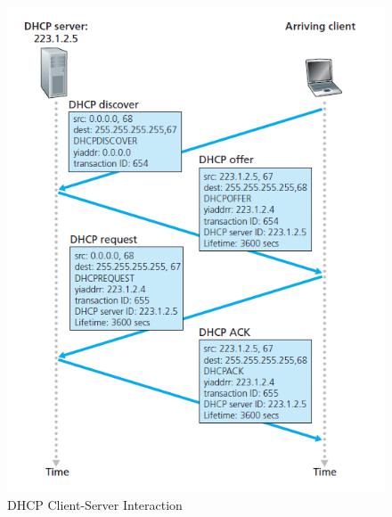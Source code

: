 \documentclass[a4paper]{article}
\theoremstyle{plain}
\theoremstyle{definition}
\begin{document}
\begin{figure}[!h]
    \centering
    \includegraphics[scale=0.8]{cn9.png}
    \caption{DHCP Client-Server Interaction}
    \label{fig:my_label_9}
\end{figure}
\end{document}
